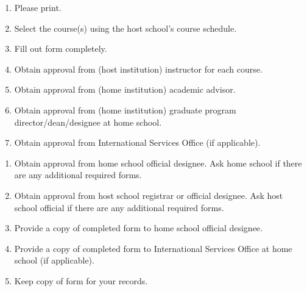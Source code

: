 \documentclass[10pt]{article}
\begin{document}
\noindent
\begin{minipage}{0.5\textwidth}
    \begin{enumerate}
    \setlength{\itemsep}{0.05em}
        \item Please print.
        \item Select the course(s) using the host school's course schedule.
        \item Fill out form completely.
        \item Obtain approval from (host institution) instructor for each course.
        \item Obtain approval from (home institution) academic advisor.
        \item Obtain approval from (home institution) graduate program director/dean/designee at home school.
        \item Obtain approval from International Services Office (if applicable).
    \end{enumerate}
\end{minipage}%
\hspace{0.2cm}
\begin{minipage}{0.5\textwidth}
    \begin{enumerate}
    \setlength{\itemsep}{0.05em}
        \setcounter{enumi}{7}
        \item Obtain approval from home school official designee. Ask home school if there are any additional required forms.
        \item Obtain approval from host school registrar or official designee. Ask host school official if there are any additional required forms.
        \item Provide a copy of completed form to home school official designee.
        \item Provide a copy of completed form to International Services Office at home school (if applicable).
        \item Keep copy of form for your records.
    \end{enumerate}
\end{minipage}
\end{document}
